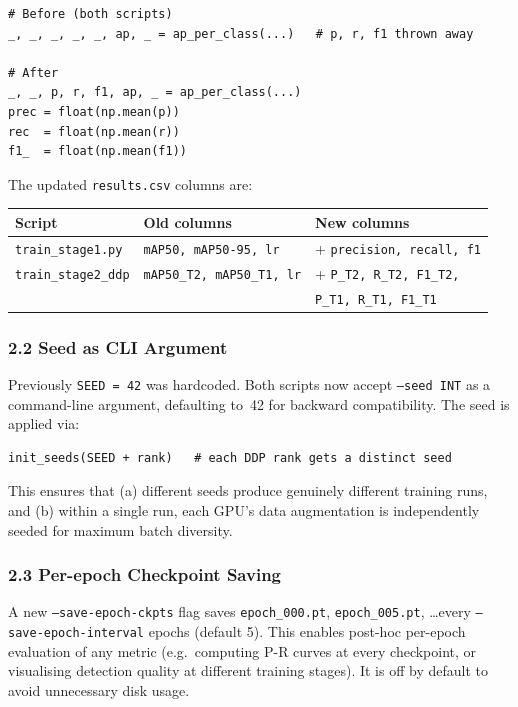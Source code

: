 \begin{verbatim}
# Before (both scripts)
_, _, _, _, _, ap, _ = ap_per_class(...)   # p, r, f1 thrown away

# After
_, _, p, r, f1, ap, _ = ap_per_class(...)
prec = float(np.mean(p))
rec  = float(np.mean(r))
f1_  = float(np.mean(f1))
\end{verbatim}

The updated \texttt{results.csv} columns are:

\begin{center}\small
\begin{tabular}{lll}
\hline
\textbf{Script}             & \textbf{Old columns}                        & \textbf{New columns} \\
\hline
\texttt{train\_stage1.py}   & \texttt{mAP50, mAP50-95, lr}                & + \texttt{precision, recall, f1} \\
\texttt{train\_stage2\_ddp} & \texttt{mAP50\_T2, mAP50\_T1, lr}          & + \texttt{P\_T2, R\_T2, F1\_T2,} \\
                             &                                              & \phantom{+} \texttt{P\_T1, R\_T1, F1\_T1} \\
\hline
\end{tabular}
\end{center}

\subsubsection*{2.2 Seed as CLI Argument}

Previously \texttt{SEED\,=\,42} was hardcoded. Both scripts now
accept \texttt{--seed INT} as a command-line argument, defaulting
to~42 for backward compatibility. The seed is applied via:
\begin{verbatim}
init_seeds(SEED + rank)   # each DDP rank gets a distinct seed
\end{verbatim}
This ensures that (a) different seeds produce genuinely different
training runs, and (b) within a single run, each GPU's data
augmentation is independently seeded for maximum batch diversity.

\subsubsection*{2.3 Per-epoch Checkpoint Saving}

A new \texttt{--save-epoch-ckpts} flag saves
\texttt{epoch\_000.pt}, \texttt{epoch\_005.pt}, \ldots every
\texttt{--save-epoch-interval} epochs (default 5). This enables
post-hoc per-epoch evaluation of any metric (e.g.\ computing
P-R curves at every checkpoint, or visualising detection quality
at different training stages). It is off by default to avoid
unnecessary disk usage.

